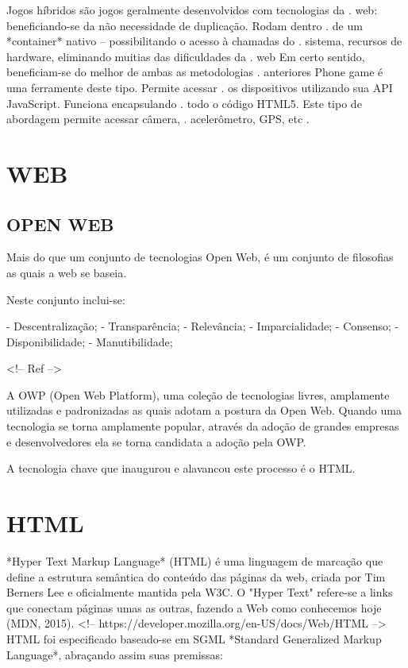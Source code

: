 \documentclass[11pt,a4paper]{article}
\begin{document}
Jogos híbridos são jogos geralmente desenvolvidos com tecnologias da .
web: beneficiando-se da não necessidade de duplicação. Rodam dentro .
de um *container* nativo – possibilitando o acesso à chamadas do    .
sistema, recursos de hardware, eliminando muitias das dificuldades da  .
web Em certo sentido, beneficiam-se do melhor de ambas as metodologias .
anteriores Phone game é uma ferramente deste tipo. Permite acessar    .
os dispositivos utilizando sua API JavaScript. Funciona encapsulando   .
todo o código HTML5. Este tipo de abordagem permite acessar câmera,  .
acelerômetro, GPS, etc                                                .

\section{WEB}

\subsection{OPEN WEB}

Mais do que um conjunto de tecnologias Open Web, é um conjunto de
filosofias as quais a web se baseia.

Neste conjunto inclui-se:

- Descentralização;
- Transparência;
- Relevância;
- Imparcialidade;
- Consenso;
- Disponibilidade;
- Manutibilidade;

<!-- Ref
-->

A OWP (Open Web Platform), uma coleção de tecnologias livres,
amplamente utilizadas e padronizadas as quais adotam a postura da Open
Web. Quando uma tecnologia se torna amplamente popular, através da
adoção de grandes empresas e desenvolvedores ela se torna candidata a
adoção pela OWP.

A tecnologia chave que inaugurou e alavancou este processo é o HTML. 

\section{HTML}

*Hyper Text Markup Language* (HTML) é uma linguagem de marcação
que define a estrutura semântica do conteúdo das páginas da
web, criada por Tim Berners Lee e oficialmente mantida pela W3C.
O "Hyper Text" refere-se a links que conectam páginas umas as
outras, fazendo a Web como conhecemos hoje (MDN, 2015). 
<!--
https://developer.mozilla.org/en-US/docs/Web/HTML --> HTML foi
especificado baseado-se em SGML *Standard Generalized Markup Language*,
abraçando assim suas premissas:
\end{document}
